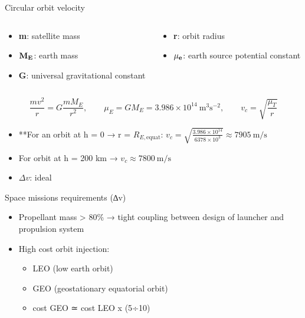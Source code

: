 \documentclass[
  ignorenonframetext,
]{beamer}
\providecommand{\tightlist}{%
  \setlength{\itemsep}{0pt}\setlength{\parskip}{0pt}}\usepackage{longtable,booktabs,array}
\begin{document}
\begin{frame}{Circular orbit velocity}
\protect\hypertarget{circular-orbit-velocity}{}
\begin{columns}[T]
\begin{column}{0.5\textwidth}
\begin{itemize}
\tightlist
\item
  \textbf{m}: satellite mass
\item
  \textbf{\(\bf{M_E}\)}: earth mass
\item
  \textbf{G}: universal gravitational constant
\end{itemize}
\end{column}

\begin{column}{0.5\textwidth}
\begin{itemize}
\tightlist
\item
  \textbf{r}: orbit radius
\item
  \(\bf{\mu_e}\): earth source potential constant
\end{itemize}
\end{column}
\end{columns}

\[\frac{mv^2}{r} = G\frac{m M_E}{r^2}, \qquad \mu_E = G M_E = 3.986 \times 10^{14} \ \text{m}^3 \text{s}^{-2}, \qquad v_c = \sqrt{\frac{\mu_T}{r}}\]

\begin{itemize}
\item
  **For an orbit at h = 0 → r = \(R_{E,\text{equat}}\):
  \(v_c = \sqrt{\frac{3.986 \times 10^{14}}{6378 \times 10^3}} \approx 7905 \ \text{m/s}\)
\item
  For orbit at h = 200 km → \(v_c \approx 7800 \ \text{m/s}\)
\item
  \textbf{\(\Delta v\)}: ideal
\end{itemize}
\end{frame}

\begin{frame}{Space missions requirements (∆v)}
\protect\hypertarget{space-missions-requirements-v}{}
\begin{itemize}
\item
  Propellant mass \textgreater{} 80\% → tight coupling between design of
  launcher and propulsion system
\item
  High cost orbit injection:

  \begin{itemize}
  \tightlist
  \item
    LEO (low earth orbit)
  \item
    GEO (geostationary equatorial orbit)
  \item
    cost GEO ≃ cost LEO x (5÷10)
  \end{itemize}
\end{itemize}
\end{frame}
\end{document}
